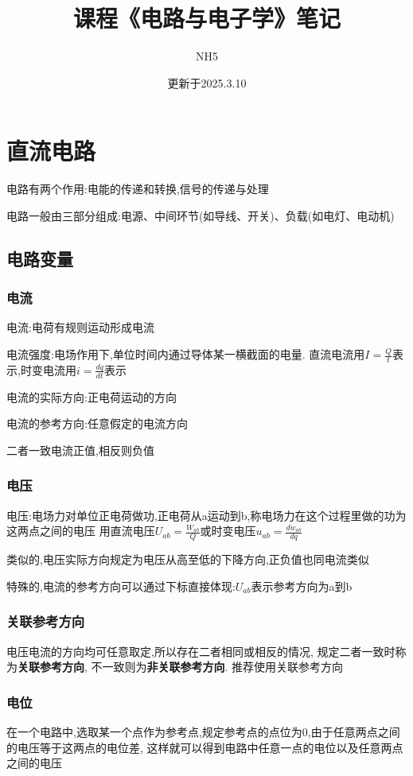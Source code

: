 \documentclass[12pt,a4paper,oneside]{ctexart}
\title{课程《电路与电子学》笔记}
\author{NH5}
\date{更新于2025.3.10}
\begin{document}
\maketitle
\section{直流电路}
电路有两个作用:电能的传递和转换,信号的传递与处理

电路一般由三部分组成:电源、中间环节(如导线、开关)、负载(如电灯、电动机)

\subsection{电路变量}
\subsubsection{电流}
电流:电荷有规则运动形成电流

电流强度:电场作用下,单位时间内通过导体某一横截面的电量.
直流电流用$I=\frac{Q}{t}$表示,时变电流用$i=\frac{dq}{dt}$表示

电流的实际方向:正电荷运动的方向

电流的参考方向:任意假定的电流方向

二者一致电流正值,相反则负值

\subsubsection{电压}
电压:电场力对单位正电荷做功,正电荷从a运动到b,称电场力在这个过程里做的功为这两点之间的电压
用直流电压$U_{ab}=\frac{W_{ab}}{Q}$或时变电压$u_{ab}=\frac{dw_{ab}}{dq}$

类似的,电压实际方向规定为电压从高至低的下降方向,正负值也同电流类似

特殊的,电流的参考方向可以通过下标直接体现:$U_{ab}$表示参考方向为a到b

\subsubsection{关联参考方向}
电压电流的方向均可任意取定,所以存在二者相同或相反的情况,
规定二者一致时称为\textbf{关联参考方向},
不一致则为\textbf{非关联参考方向}.
推荐使用关联参考方向

\subsubsection{电位}
在一个电路中,选取某一个点作为参考点,规定参考点的点位为0,由于任意两点之间的电压等于这两点的电位差,
这样就可以得到电路中任意一点的电位以及任意两点之间的电压
\end{document}
